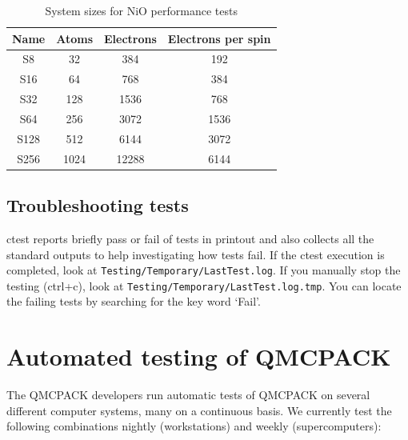 \begin{table}[h]
\begin{center}
\begin{tabular}{|c|c|c|c|}
\hline
\bfseries Name&  \bfseries Atoms& \bfseries Electrons&  \bfseries Electrons per spin \\
\hline
 S8  &  32  &    384  &   192 \\
S16 &   64  &    768  &  384 \\
S32  & 128  &   1536 &           768 \\
S64  & 256  &   3072 &     1536 \\
S128  & 512  &   6144 &      3072 \\
S256  & 1024 & 12288 &  6144 \\
\hline
\end{tabular}
  \caption{System sizes for NiO performance tests}
  \label{tab:niotests}
\end{center}
\end{table}

\subsection{Troubleshooting tests}
ctest reports briefly pass or fail of tests in printout and also collects all the standard outputs to help investigating how tests fail.
If the ctest execution is completed, look at \texttt{Testing/Temporary/LastTest.log}.
If you manually stop the testing (ctrl+c), look at \texttt{Testing/Temporary/LastTest.log.tmp}.
You can locate the failing tests by searching for the key word `Fail'.

\section{Automated testing of QMCPACK}

The QMCPACK developers run automatic tests of QMCPACK on several
different computer systems,  many on a continuous basis. We currently test
the following combinations nightly (workstations) and weekly (supercomputers):

